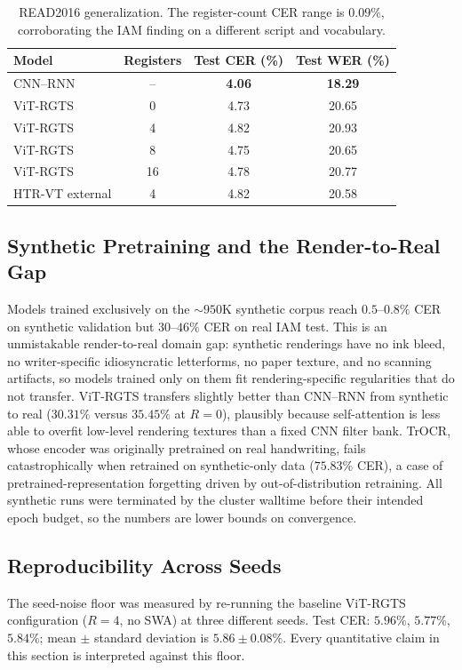\begin{table}[h]
\centering
\small
\caption{READ2016 generalization. The register-count CER range is $0.09\%$, corroborating the IAM finding on a different script and vocabulary.}
\label{tab:read2016}
\begin{tabular}{lccc}
\toprule
Model & Registers & Test CER (\%) & Test WER (\%) \\
\midrule
CNN--RNN               & --  & \textbf{4.06} & \textbf{18.29} \\
ViT-RGTS               & 0   & 4.73          & 20.65 \\
ViT-RGTS               & 4   & 4.82          & 20.93 \\
ViT-RGTS               & 8   & 4.75          & 20.65 \\
ViT-RGTS               & 16  & 4.78          & 20.77 \\
HTR-VT external        & 4   & 4.82          & 20.58 \\
\bottomrule
\end{tabular}
\end{table}

\subsection{Synthetic Pretraining and the Render-to-Real Gap}
\label{sec:res_synth}

Models trained exclusively on the ${\sim}950$K synthetic corpus reach $0.5$--$0.8\%$ CER on synthetic validation but $30$--$46\%$ CER on real IAM test. This is an unmistakable render-to-real domain gap: synthetic renderings have no ink bleed, no writer-specific idiosyncratic letterforms, no paper texture, and no scanning artifacts, so models trained only on them fit rendering-specific regularities that do not transfer. ViT-RGTS transfers slightly better than CNN--RNN from synthetic to real ($30.31\%$ versus $35.45\%$ at $R = 0$), plausibly because self-attention is less able to overfit low-level rendering textures than a fixed CNN filter bank. TrOCR, whose encoder was originally pretrained on real handwriting, fails catastrophically when retrained on synthetic-only data ($75.83\%$ CER), a case of pretrained-representation forgetting driven by out-of-distribution retraining. All synthetic runs were terminated by the cluster walltime before their intended epoch budget, so the numbers are lower bounds on convergence.

\subsection{Reproducibility Across Seeds}
\label{sec:res_seeds}

The seed-noise floor was measured by re-running the baseline ViT-RGTS configuration ($R = 4$, no SWA) at three different seeds. Test CER: $5.96\%$, $5.77\%$, $5.84\%$; mean $\pm$ standard deviation is $5.86 \pm 0.08\%$. Every quantitative claim in this section is interpreted against this floor.
